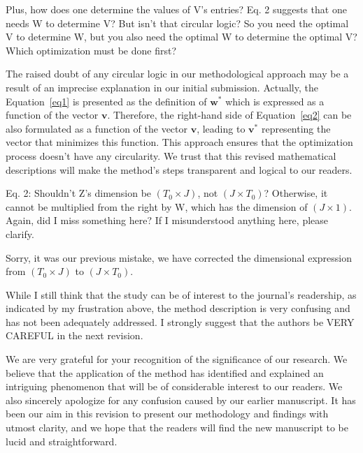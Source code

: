 \RC{} Plus, how does one determine the values of V's entries? Eq. 2 suggests that one needs W to determine V? But isn't that circular logic? So you need the optimal V to determine W, but you also need the optimal W to determine the optimal V? Which optimization must be done first?

\AR{} The raised doubt of any circular logic in our methodological approach may be a result of an imprecise explanation in our initial submission. Actually, the Equation~\ref{eq1} is presented as the definition of $\mathbf{w^*}$ which is expressed as a function of the vector $\mathbf{v}$. Therefore, the right-hand side of Equation~\ref{eq2} can be also formulated as a function of the vector $\mathbf{v}$, leading to $\mathbf{v^*}$ representing the vector that minimizes this function. This approach ensures that the optimization process doesn't have any circularity. We trust that this revised mathematical descriptions will make the method's steps transparent and logical to our readers.

\RC{} Eq. 2: Shouldn't Z's dimension be $(T_0 \times J)$, not $(J \times T_0)$? Otherwise, it cannot be multiplied from the right by W, which has the dimension of $(J \times 1)$. Again, did I miss something here? If I misunderstood anything here, please clarify.

\AR{} Sorry, it was our previous mistake, we have corrected the dimensional expression from $(T_0 \times J)$ to $(J \times T_0)$.

\RC{} While I still think that the study can be of interest to the journal's readership, as indicated by my frustration above, the method description is very confusing and has not been adequately addressed. I strongly suggest that the authors be VERY CAREFUL in the next revision.

\AR{} We are very grateful for your recognition of the significance of our research. We believe that the application of the method has identified and explained an intriguing phenomenon that will be of considerable interest to our readers. We also sincerely apologize for any confusion caused by our earlier manuscript. It has been our aim in this revision to present our methodology and findings with utmost clarity, and we hope that the readers will find the new manuscript to be lucid and straightforward.

